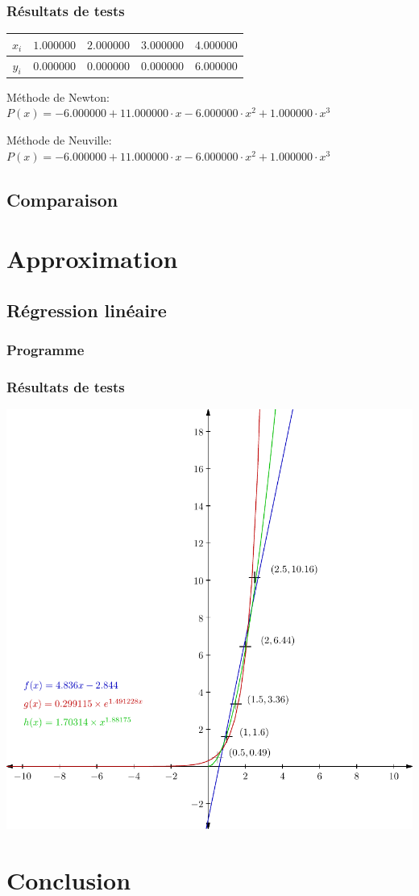 \documentclass{report}
\begin{document}
      \subsection{Résultats de tests}
			\begin{tabular}{| c | c | c | c | c |}
			\hline 
			$x_{i}$ & $1.000000$ & $2.000000$ & $3.000000$ & $4.000000 $ \\ 
			\hline 
			$y_{i}$ & $0.000000$ & $0.000000$ & $0.000000$ & $6.000000 $ \\ 
			\hline 
			\end{tabular}

			Méthode de Newton: $P(x)= -6.000000 + 11.000000 \cdot x- 6.000000 \cdot x^{2}  + 1.000000 \cdot x^{3} $

			Méthode de Neuville: $P(x)= -6.000000 + 11.000000 \cdot x- 6.000000 \cdot x^{2}  + 1.000000 \cdot x^{3} $
			
	\renewcommand{\arraystretch}{2}
	\renewcommand{\arraystretch}{1}
    \section{Comparaison}
  \chapter{Approximation}
    \section{Régression linéaire}
      \subsection{Programme}
	
      \subsection{Résultats de tests}
	\includegraphics{graphiques/pdf_output/reglin.pdf}
	\renewcommand{\arraystretch}{2}
	\renewcommand{\arraystretch}{1}
  \chapter{Conclusion}
\end{document}
